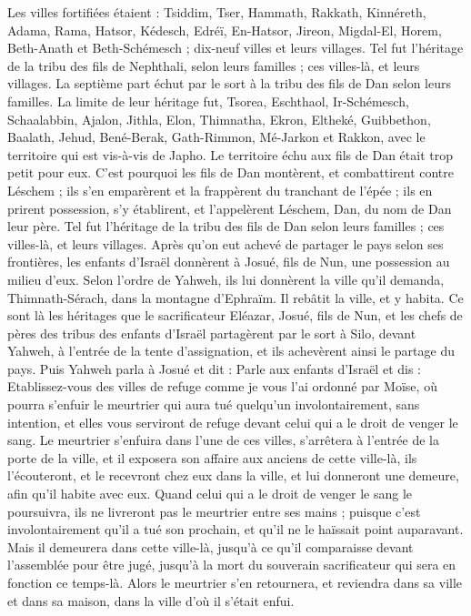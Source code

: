 \begin{multicols}{2}
Les villes fortifiées étaient : Tsiddim, Tser, Hammath, Rakkath, Kinnéreth,
Adama, Rama, Hatsor,
Kédesch, Edréï, En-Hatsor,
Jireon, Migdal-El, Horem, Beth-Anath et Beth-Schémesch ; dix-neuf villes et leurs villages.
Tel fut l’héritage de la tribu des fils de Nephthali, selon leurs familles ; ces villes-là, et leurs villages.
La septième part échut par le sort à la tribu des fils de Dan selon leurs familles.
La limite de leur héritage fut, Tsorea, Eschthaol, Ir-Schémesch,
Schaalabbin, Ajalon, Jithla,
Elon, Thimnatha, Ekron,
Eltheké, Guibbethon, Baalath,
Jehud, Bené-Berak, Gath-Rimmon,
Mé-Jarkon et Rakkon, avec le territoire qui est vis-à-vis de Japho.
Le territoire échu aux fils de Dan était trop petit pour eux. C’est pourquoi les fils de Dan montèrent, et combattirent contre Léschem ; ils s’en emparèrent et la frappèrent du tranchant de l’épée ; ils en prirent possession, s’y établirent, et l’appelèrent Léschem, Dan, du nom de Dan leur père.
Tel fut l’héritage de la tribu des fils de Dan selon leurs familles ; ces villes-là, et leurs villages.
Après qu’on eut achevé de partager le pays selon ses frontières, les enfants d’Israël donnèrent à Josué, fils de Nun, une possession au milieu d’eux.
Selon l’ordre de Yahweh, ils lui donnèrent la ville qu’il demanda, Thimnath-Sérach, dans la montagne d’Ephraïm. Il rebâtit la ville, et y habita.
Ce sont là les héritages que le sacrificateur Eléazar, Josué, fils de Nun, et les chefs de pères des tribus des enfants d’Israël partagèrent par le sort à Silo, devant Yahweh, à l’entrée de la tente d’assignation, et ils achevèrent ainsi le partage du pays.
\VerseOne{}Puis Yahweh parla à Josué et dit :
Parle aux enfants d’Israël et dis : Etablissez-vous des villes de refuge comme je vous l’ai ordonné par Moïse,
où pourra s’enfuir le meurtrier qui aura tué quelqu’un involontairement, sans intention, et elles vous serviront de refuge devant celui qui a le droit de venger le sang.
Le meurtrier s’enfuira dans l’une de ces villes, s’arrêtera à l’entrée de la porte de la ville, et il exposera son affaire aux anciens de cette ville-là, ils l’écouteront, et le recevront chez eux dans la ville, et lui donneront une demeure, afin qu’il habite avec eux.
Quand celui qui a le droit de venger le sang le poursuivra, ils ne livreront pas le meurtrier entre ses mains ; puisque c’est involontairement qu’il a tué son prochain, et qu’il ne le haïssait point auparavant.
Mais il demeurera dans cette ville-là, jusqu’à ce qu’il comparaisse devant l’assemblée pour être jugé, jusqu’à la mort du souverain sacrificateur qui sera en fonction ce temps-là. Alors le meurtrier s’en retournera, et reviendra dans sa ville et dans sa maison, dans la ville d’où il s’était enfui.

\end{multicols}
